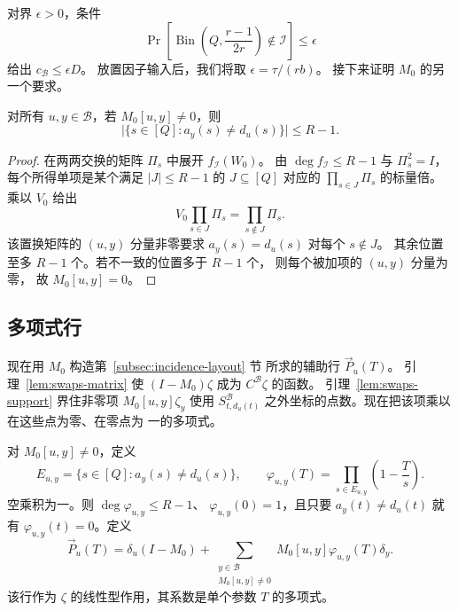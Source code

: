 对界 $\epsilon>0$，条件
\begin{equation}\label{eq:incidence-tail}
 \Pr\!\left[\operatorname{Bin}\!\left(Q,\frac{r-1}{2r}\right)
                         \notin\mathcal I\right]\le\epsilon
\end{equation}
给出 $c_{\mathcal B}\le\epsilon D$。
放置因子输入后，我们将取 $\epsilon=\tau/(rb)$。
接下来证明 $M_0$ 的另一个要求。

\begin{lemma}\label{lem:swaps-support}
对所有 $u,y\in\mathcal B$，若 $M_0[u,y]\ne0$，则
\[
 \bigl|\{s\in[Q]:a_y(s)\ne d_u(s)\}\bigr|\le R-1.
\]
\end{lemma}
\begin{proof}
在两两交换的矩阵 $\Pi_s$ 中展开 $f_{\mathcal I}(W_0)$。
由 $\deg f_{\mathcal I}\le R-1$ 与 $\Pi_s^2=I$，
每个所得单项是某个满足 $|J|\le R-1$ 的
$J\subseteq[Q]$ 对应的 $\prod_{s\in J}\Pi_s$
的标量倍。乘以 $V_0$ 给出
\[
 V_0\prod_{s\in J}\Pi_s=\prod_{s\notin J}\Pi_s.
\]
该置换矩阵的 $(u,y)$ 分量非零要求
$a_y(s)=d_u(s)$ 对每个 $s\notin J$。
其余位置至多 $R-1$ 个。若不一致的位置多于 $R-1$ 个，
则每个被加项的 $(u,y)$ 分量为零，
故 $M_0[u,y]=0$。
\end{proof}

\subsection{多项式行}
现在用 $M_0$ 构造第~\ref{subsec:incidence-layout} 节
所求的辅助行 $\vec{P}_u(T)$。
引理~\ref{lem:swaps-matrix} 使 $(I-M_0)\zeta$
成为 $C^{\mathcal B}\zeta$ 的函数。
引理~\ref{lem:swaps-support} 界住非零项
$M_0[u,y]\zeta_y$ 使用 $S^{\mathcal B}_{t,d_u(t)}$
之外坐标的点数。现在把该项乘以在这些点为零、在零点为
一的多项式。

对 $M_0[u,y]\ne0$，定义
\begin{equation}\label{eq:coefficient-correction}
 E_{u,y}=\{s\in[Q]:a_y(s)\ne d_u(s)\},\qquad
 \varphi_{u,y}(T)=\prod_{s\in E_{u,y}}\left(1-\frac Ts\right).
\end{equation}
空乘积为一。则 $\deg\varphi_{u,y}\le R-1$、
$\varphi_{u,y}(0)=1$，且只要 $a_y(t)\ne d_u(t)$ 就有
$\varphi_{u,y}(t)=0$。定义
\begin{equation}\label{eq:swaps-row}
 \vec{P}_u(T)=\delta_u(I-M_0)+
 \sum_{\substack{y\in\mathcal B\\M_0[u,y]\ne0}}
 M_0[u,y]\varphi_{u,y}(T)\delta_y.
\end{equation}
该行作为 $\zeta$ 的线性型作用，其系数是单个参数 $T$
的多项式。

